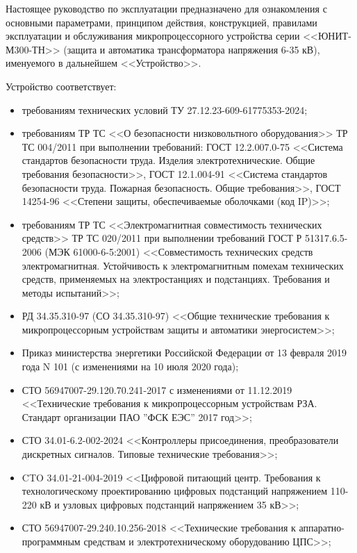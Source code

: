 \par
Настоящее руководство по эксплуатации предназначено для ознакомления с основными параметрами, принципом действия, конструкцией, правилами эксплуатации и обслуживания микропроцессорного устройства серии <<ЮНИТ-М300-ТН>> (защита и автоматика трансформатора напряжения 6-35 кВ), именуемого в дальнейшем <<Устройство>>.

\par
Устройство соответствует:
\begin{itemize}
    \item требованиям технических условий ТУ 27.12.23-609-61775353-2024;
    \item требованиям ТР ТС <<О безопасности низковольтного оборудования>> ТР ТС 004/2011 при выполнении требований: ГОСТ 12.2.007.0-75 <<Система стандартов безопасности труда. Изделия электротехнические. Общие требования безопасности>>, ГОСТ 12.1.004-91 <<Система стандартов безопасности труда. Пожарная безопасность. Общие требования>>, ГОСТ 14254-96 <<Степени защиты, обеспечиваемые оболочками (код IP)>>; 
    \item требованиям ТР ТС <<Электромагнитная совместимость технических средств>> ТР ТС 020/2011 при выполнении требований ГОСТ Р 51317.6.5-2006 (МЭК 61000-6-5:2001) <<Совместимость технических средств электромагнитная. Устойчивость к электромагнитным помехам технических средств, применяемых на электростанциях и подстанциях. Требования и методы испытаний>>;
    \item РД 34.35.310-97 (СО 34.35.310-97) <<Общие технические требования к микропроцессорным устройствам защиты и автоматики энергосистем>>;
    \item Приказ министерства энергетики Российской Федерации от 13 февраля 2019 года N 101 (с изменениями на 10 июля 2020 года);
    \item СТО 56947007-29.120.70.241-2017 с изменениями от 11.12.2019 <<Технические требования к микропроцессорным устройствам РЗА. Стандарт организации ПАО ''ФСК ЕЭС'' 2017 год>>;
    \item СТО 34.01-6.2-002-2024 <<Контроллеры присоединения, преобразователи дискретных сигналов. Типовые технические требования>>;
    \item CTO 34.01-21-004-2019 <<Цифровой питающий центр. Требования к технологическому проектированию цифровых подстанций напряжением 110-220 кВ и узловых цифровых подстанций напряжением 35 кВ>>;
    \item СТО 56947007-29.240.10.256-2018 <<Технические требования к аппаратно-программным средствам и электротехническому оборудованию ЦПС>>;

\end{itemize}
